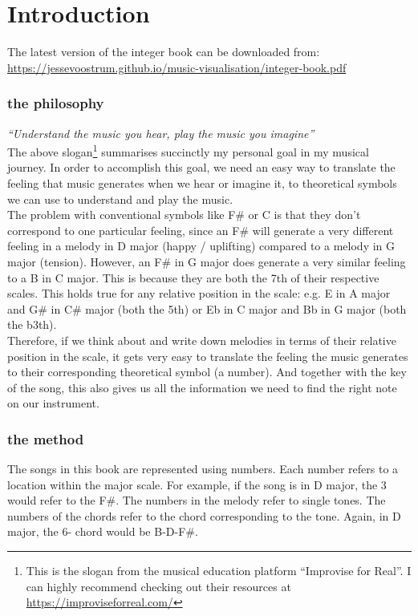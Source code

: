 \section*{Introduction}

\sffamily

The latest version of the integer book can be downloaded from: \url{https://jessevoostrum.github.io/music-visualisation/integer-book.pdf}

\subsubsection*{the philosophy}
\textit{“Understand the music you hear, play the music you imagine”} \\

\noindent The above slogan\footnote{This is the slogan from the musical education platform “Improvise for Real”. I can highly recommend checking out their resources at \url{https://improviseforreal.com/}} summarises succinctly my personal goal in my musical journey. In order to accomplish this goal, we need an easy way to translate the feeling that music generates when we hear or imagine it, to theoretical symbols we can use to understand and play the music. \\

\noindent The problem with conventional symbols like F\# or C is that they don't correspond to one particular feeling, since an F\# will generate a very different feeling in a melody in D major (happy / uplifting) compared to a melody in G major (tension). However, an F\# in G major does generate a very similar feeling to a B in C major. This is because they are both the 7th of their respective scales.  This holds true for any relative position in the scale: e.g. E in A major and G\# in C\# major (both the 5th) or Eb in C major and Bb in G major (both the b3th). \\

\noindent Therefore, if we think about and write down melodies in terms of their relative position in the scale, it gets very easy to translate the feeling the music generates to their corresponding theoretical symbol (a number). And together with the key of the song, this also gives us all the information we need to find the right note on our instrument. 

\subsubsection*{the method}
The songs in this book are represented using numbers. Each number refers to a location within the major scale. For example, if the song is in D major, the 3 would refer to the F\#. The numbers in the melody refer to single tones. The numbers of the chords refer to the chord corresponding to the tone. Again, in D major, the 6- chord would be B-D-F\#.  

